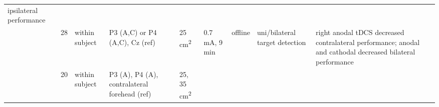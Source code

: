 \documentclass[11pt,]{memoir}
\begin{document}
\begin{longtable}[]{@{}lllllllll@{}}
\begin{minipage}[t]{0.24\columnwidth}
ipsilateral performance\strut
\end{minipage}\tabularnewline
\begin{minipage}[t]{0.12\columnwidth}\raggedright
\textcite{Filmer2015}\strut
\end{minipage} & \begin{minipage}[t]{0.02\columnwidth}\raggedright
28\strut
\end{minipage} & \begin{minipage}[t]{0.04\columnwidth}\raggedright
within
subject\strut
\end{minipage} & \begin{minipage}[t]{0.11\columnwidth}\raggedright
P3 (A,C) or P4 (A,C), Cz
(ref)\strut
\end{minipage} & \begin{minipage}[t]{0.03\columnwidth}\raggedright
25
cm\textsuperscript{2}\strut
\end{minipage} & \begin{minipage}[t]{0.05\columnwidth}\raggedright
0.7 mA, 9
min\strut
\end{minipage} & \begin{minipage}[t]{0.05\columnwidth}\raggedright
offline\strut
\end{minipage} & \begin{minipage}[t]{0.11\columnwidth}\raggedright
uni/bilateral target
detection\strut
\end{minipage} & \begin{minipage}[t]{0.24\columnwidth}\raggedright
right anodal tDCS decreased contralateral performance;
anodal and cathodal decreased bilateral performance\strut
\end{minipage}\tabularnewline
\begin{minipage}[t]{0.12\columnwidth}\raggedright
\textcite{Learmonth2015}\strut
\end{minipage} & \begin{minipage}[t]{0.02\columnwidth}\raggedright
20\strut
\end{minipage} & \begin{minipage}[t]{0.04\columnwidth}\raggedright
within
subject\strut
\end{minipage} & \begin{minipage}[t]{0.11\columnwidth}\raggedright
P3 (A), P4 (A),
contralateral forehead
(ref)\strut
\end{minipage} & \begin{minipage}[t]{0.03\columnwidth}\raggedright
25,
35
cm\textsuperscript{2}\strut
\end{minipage} & \begin{minipage}[t]{0.05\columnwidth}\raggedright

\end{minipage}
\end{longtable}
\end{document}
